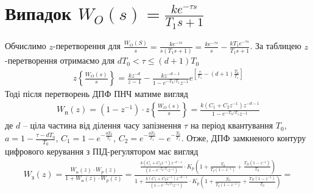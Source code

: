 \section{Випадок \texorpdfstring{$W_O(s) = \frac{k e^{-\tau s}}{T_1 s + 1}$}{3}}
Обчислимо $z$-перетворення для $\frac{W_O(S)}{s} = \frac{k e^{-\tau s}}{s(T_1 s + 1)} = 
\frac{k e^{-\tau s}}{s} - \frac{k T_1 e^{-\tau s}}{T_1 s + 1}$.
За таблицею $z$-перетворення отримаємо для $d T_0 < \tau \leq (d+1)T_0$
\begin{gather}
    z\left\{\frac{W_O(s)}{s} \right\} = \frac{k z^{-d}}{z - 1} - 
    \frac{k z^{-d-1}}{1 - e^{-T_0/ T_1} z^{-1}} 
    e^{\left[
        \frac{\tau}{T_1} - (d+1) \frac{T_0}{T_1}
     \right]}
\end{gather}
Тоді після перетворень ДПФ ПНЧ матиме вигляд
\begin{gather}\label{transfer_function_for_stability}
    W_{\text{п}}(z) = \left(1 - z^{-1}\right) \cdot z\left\{\frac{W_O(s)}{s} \right\} = 
    \frac{
        k \left(C_1 + C_2 z^{-1}\right) z^{-d-1}
    }{
        1 - e^{-T_0 / T_1} z^{-1}
    }
\end{gather}
де $d$ -- ціла частина від ділення часу запізнення $\tau$ на період квантування
$T_0$, $a = 1 - \frac{\tau - d T_0}{T_0}$, $C_1 = 1 - e^{-\frac{a T_0}{T_1}}$,
$C_2 = e^{-\frac{a T_0}{T_1}} - e^{-\frac{T_0}{T_1}}$.
Отже, ДПФ замкненого контуру цифрового керування з ПІД-регулятором має вигляд
\begin{gather*}
    W_{\text{з}}(z) = \frac{
        W_{\text{п}} (z) \cdot W_p(z)
    }{1 + W_{\text{п}} (z) \cdot W_p(z)} =
    \frac{
        \frac{
            k \left(C_1 + C_2 z^{-1}\right) z^{-d-1}
        }{
            \left(1 - e^{-T_0 / T_1} z^{-1}\right)
        } \cdot K_p \left(
            1 + \frac{T_0}{T_I \left(1 - z^{-1}\right)} + \frac{T_D\left(1 - z^{-1}\right)}{T_0}
        \right)
    }{
        1 + \frac{
            k \left(C_1 + C_2 z^{-1}\right) z^{-d-1}
        }{
            \left(1 - e^{-T_0 / T_1} z^{-1}\right)
        } \cdot K_p \left(
            1 + \frac{T_0}{T_I \left(1 - z^{-1}\right)} + \frac{T_D\left(1 - z^{-1}\right)}{T_0}
        \right)
    } =
\end{gather*}

